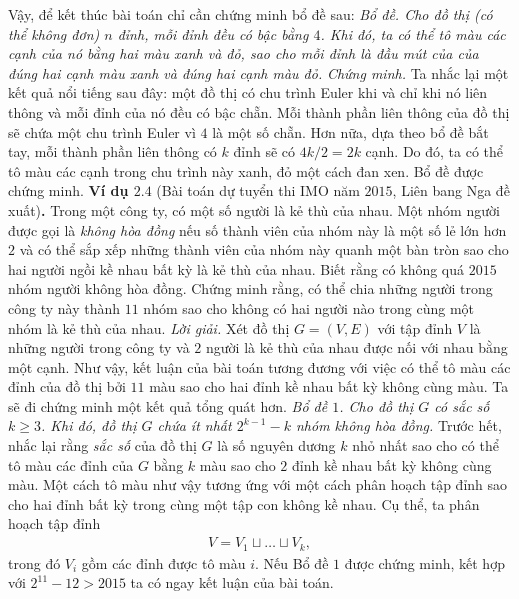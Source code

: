 \begin{multicols}{2}
	\vskip 0.1cm
	Vậy, để kết thúc bài toán chỉ cần chứng minh bổ đề sau:
	\vskip 0.1cm
	\textit{Bổ đề. Cho đồ thị (có thể không đơn) $n$ đỉnh, mỗi đỉnh đều có bậc bằng $4$. Khi đó, ta có thể tô màu các cạnh của nó bằng hai màu xanh và đỏ, sao cho mỗi đỉnh là đầu mút của của đúng hai cạnh màu xanh và đúng hai cạnh màu đỏ.}
	\vskip 0.1cm
	\textit{Chứng minh.} Ta nhắc lại một kết quả nổi tiếng sau đây: một đồ thị có chu trình Euler khi và chỉ khi nó liên thông và mỗi đỉnh của nó đều có bậc chẵn. 
	\vskip 0.1cm
	Mỗi thành phần liên thông của đồ thị sẽ chứa một chu trình Euler vì $4$ là
	một số chẵn. Hơn nữa, dựa theo bổ đề bắt tay, mỗi thành phần liên
	thông có $k$ đỉnh sẽ có $4k/2 = 2k$ cạnh. Do đó, ta có thể tô màu các cạnh trong chu trình này xanh, đỏ một cách đan xen. Bổ đề được chứng minh. 
	\vskip 0.1cm 
	\textbf{\color{hoccungpi}Ví dụ $\pmb{2.4}$} (Bài toán dự tuyển thi IMO năm $2015$, Liên bang Nga đề xuất)\textbf{\color{hoccungpi}.}
	Trong một công ty, có một số người là kẻ thù của nhau. Một nhóm người được gọi là \textit{không hòa đồng} nếu số thành viên của nhóm này là một số lẻ lớn hơn $2$ và có thể sắp xếp những thành viên của nhóm này quanh một bàn tròn sao cho hai người ngồi kề nhau bất kỳ là kẻ thù của nhau. Biết rằng có không quá $2015$ nhóm người không hòa đồng. Chứng minh rằng, có thể chia những người trong công ty này thành $11$ nhóm sao cho không có hai người nào trong cùng một nhóm là kẻ thù của nhau.
	\vskip 0.1cm
	\textit{Lời giải.}
	Xét đồ thị $G=(V,E)$ với tập đỉnh $V$ là những người trong công ty và $2$ người là kẻ thù của nhau được nối với nhau bằng một cạnh. Như vậy, kết luận của bài toán tương đương với việc có thể tô màu các đỉnh của đồ thị bởi $11$ màu sao cho hai đỉnh kề nhau bất kỳ không cùng màu. Ta sẽ đi chứng minh một kết quả tổng quát hơn.
	\vskip 0.1cm
	\textit{{Bổ đề $1$.} Cho đồ thị $G$ có sắc số $k \geq 3$. Khi đó, đồ thị $G$ chứa ít nhất $2^{k-1} -k$ nhóm không hòa đồng.} 
	\vskip 0.1cm
	Trước hết, nhắc lại rằng \textit{sắc số} của đồ thị $G$ là số nguyên dương $k$ nhỏ nhất sao cho có thể tô màu các đỉnh của $G$ bằng $k$ màu sao cho $2$ đỉnh kề nhau bất kỳ không cùng màu. Một cách tô màu như vậy tương ứng với một cách phân hoạch tập đỉnh sao cho hai đỉnh bất kỳ trong cùng một tập con không kề nhau. Cụ thể, ta phân hoạch tập đỉnh 
	\begin{align*}
		V = V_1 \sqcup \dots \sqcup V_k,  \tag{$1$}
	\end{align*} 
	trong đó $V_i$ gồm các đỉnh  được tô màu $i$. Nếu Bổ đề $1$ được chứng minh, kết hợp với $2^{11} -12 >2015$ ta có ngay kết luận của bài toán. 

\end{multicols}
